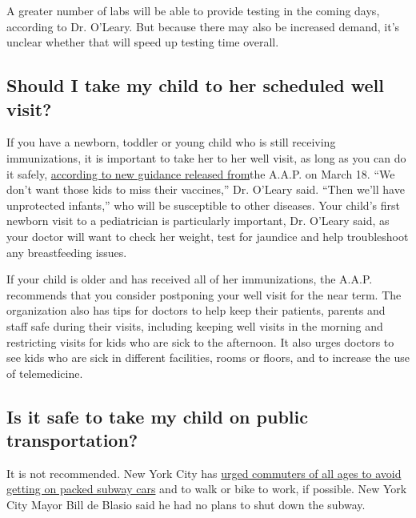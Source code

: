 A greater number of labs will be able to provide testing in the coming
days, according to Dr. O'Leary. But because there may also be increased
demand, it's unclear whether that will speed up testing time overall.

\hypertarget{should-i-take-my-child-to-her-scheduled-well-visit}{%
\subsection{Should I take my child to her scheduled well
visit?}\label{should-i-take-my-child-to-her-scheduled-well-visit}}

If you have a newborn, toddler or young child who is still receiving
immunizations, it is important to take her to her well visit, as long as
you can do it safely,
\href{https://services.aap.org/en/pages/covid-19-clinical-guidance-q-a/}{according
to new guidance released from}the A.A.P. on March 18. ``We don't want
those kids to miss their vaccines,'' Dr. O'Leary said. ``Then we'll have
unprotected infants,'' who will be susceptible to other diseases. Your
child's first newborn visit to a pediatrician is particularly important,
Dr. O'Leary said, as your doctor will want to check her weight, test for
jaundice and help troubleshoot any breastfeeding issues.

If your child is older and has received all of her immunizations, the
A.A.P. recommends that you consider postponing your well visit for the
near term. The organization also has tips for doctors to help keep their
patients, parents and staff safe during their visits, including keeping
well visits in the morning and restricting visits for kids who are sick
to the afternoon. It also urges doctors to see kids who are sick in
different facilities, rooms or floors, and to increase the use of
telemedicine.

\hypertarget{is-it-safe-to-take-my-child-on-public-transportation}{%
\subsection{Is it safe to take my child on public
transportation?}\label{is-it-safe-to-take-my-child-on-public-transportation}}

It is not recommended. New York City has
\href{https://www1.nyc.gov/assets/doh/downloads/pdf/imm/stop-the-spread-poster.pdf}{urged
commuters of all ages to avoid getting on packed subway cars} and to
walk or bike to work, if possible. New York City Mayor Bill de Blasio
said he had no plans to shut down the subway.

